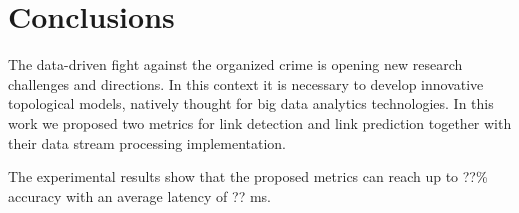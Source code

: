 \section{Conclusions}
\label{sec:conclusions}

The data-driven fight against the organized crime is opening new research challenges and directions. 
In this context it is necessary to develop innovative topological models, natively thought for big data analytics technologies.
In this work we proposed two metrics for link detection and link prediction together with their data stream processing implementation. 

The experimental results show that the proposed metrics can reach up to ??\% accuracy with an average latency of ?? ms.
